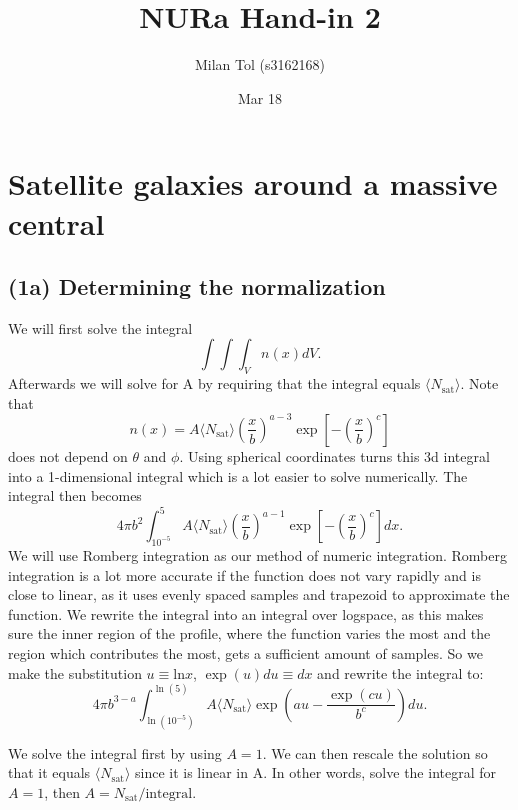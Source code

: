 \documentclass{article}
\title{NURa Hand-in 2}
\author{Milan Tol (s3162168)}
\date{Mar 18}
\begin{document}
\maketitle


\section{Satellite galaxies around a massive central}

\subsection{(1a) Determining the normalization}
We will first solve the integral 
\begin{equation}
\int \int \int_V n(x) dV.
\end{equation}
Afterwards we will solve for A by requiring that the integral equals $\langle N_\mathrm{sat} \rangle$.
Note that
\begin{equation}
n(x) = A \langle N_\mathrm{sat} \rangle 
\left( \frac{x}{b}\right)^{a-3}
\exp\left[-\left(\frac{x}{b}\right)^c\right]
\end{equation}
does not depend on $\theta$ and  $\phi$. Using spherical coordinates turns this 3d integral into a 
1-dimensional integral which is a lot easier to solve numerically. 
The integral then becomes
\begin{equation}
4\pi b^2\int_{10^{-5}}^5 
A \langle N_\mathrm{sat} \rangle 
\left( \frac{x}{b}\right)^{a-1}
\exp\left[-\left(\frac{x}{b}\right)^c\right]
dx.
\end{equation}
We will use Romberg integration as our method of numeric integration.
Romberg integration is a lot more accurate if the function does not vary rapidly and is close to linear,
as it uses evenly spaced samples and trapezoid to approximate the function. 
We rewrite the integral into an integral over logspace, as this makes sure the inner region of the profile, 
where the function varies the most and the region which contributes the most, gets a sufficient amount of samples.
So we make the substitution $u \equiv \mathrm{ln}x$, $\exp(u)du \equiv dx$
and rewrite the integral to:
\begin{equation}
4\pi b^{3 - a}\int_{\ln(10^{-5})}^{\ln(5)} 
A \langle N_\mathrm{sat} \rangle 
\exp\left(au
-\frac{\exp(cu)}{b^c}\right)
du.
\end{equation}

We solve the integral first by using $A=1$. We can then rescale the solution so that it equals $\langle N_\mathrm{sat} \rangle$
since it is linear in A. In other words, solve the integral for $A=1$, then $A = N_\mathrm{sat} / \mathrm{integral}$.
\end{document}
